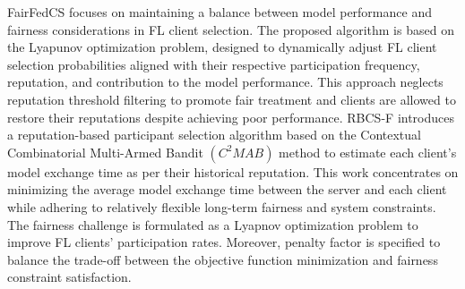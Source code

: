 \documentclass{article}
\begin{document}
FairFedCS \cite{shi2023fairness} 
focuses on maintaining a balance between model performance and fairness considerations in FL client selection. The proposed algorithm is based on the Lyapunov optimization problem, designed to dynamically adjust FL client selection probabilities aligned with their respective participation frequency, reputation, and contribution to the model performance. This approach neglects reputation threshold filtering to promote fair treatment and clients are allowed to restore their reputations despite achieving poor performance.
RBCS-F \cite{huang2020efficiency} 
introduces a reputation-based participant selection algorithm based on the Contextual Combinatorial Multi-Armed Bandit \begin{math} (C^2MAB)\end{math} method to estimate each client's model exchange time as per their historical reputation.  
This work concentrates on minimizing the average model exchange time between the server and each client while adhering to relatively flexible long-term fairness and system constraints. The fairness challenge is formulated as a Lyapnov optimization problem to improve FL clients' participation rates. Moreover, penalty factor is specified to balance the trade-off between the objective function minimization and fairness constraint satisfaction. 
\end{document}
